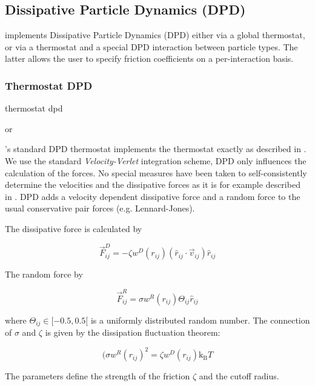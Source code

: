 \subsection{Dissipative Particle Dynamics (DPD) } \label{sec:DPD}

\es implements Dissipative Particle Dynamics (DPD) either via a global
thermostat, or via a thermostat and a special DPD interaction between
particle types.  The latter allows the user to specify friction
coefficients on a per-interaction basis.

\subsubsection{Thermostat DPD}

\begin{essyntax}
  thermostat dpd    
  \begin{features}
     or 
  \end{features}
\end{essyntax}

\es's standard DPD thermostat implements the thermostat exactly as
described in \cite{soddeman03a}.  We use the standard
\textit{Velocity-Verlet} integration scheme, \eg DPD only influences
the calculation of the forces. No special measures have been taken to
self-consistently determine the velocities and the dissipative forces
as it is for example described in \cite{Nikunen03}.  DPD adds a
velocity dependent dissipative force and a random force to the usual
conservative pair forces (e.g. Lennard-Jones).

The dissipative force is calculated by

$$ \vec{F}_{ij}^{D} = -\zeta w^D (r_{ij}) (\hat{r}_{ij} \cdot \vec{v}_{ij}) \hat{r}_{ij} $$

The random force by

$$ \vec{F}_{ij}^R = \sigma w^R (r_{ij}) \Theta_{ij} \hat{r}_{ij} $$

where $ \Theta_{ij} \in [ -0.5 , 0.5 [ $ is a uniformly distributed random number.
The connection of $\sigma $ and $\zeta $ is given by the dissipation fluctuation theorem:
 
$$ (\sigma w^R (r_{ij})^2=\zeta w^D (r_{ij}) \text{k}_\text{B} T $$

The parameters   define the strength of the
friction $\zeta$ and the cutoff radius.

